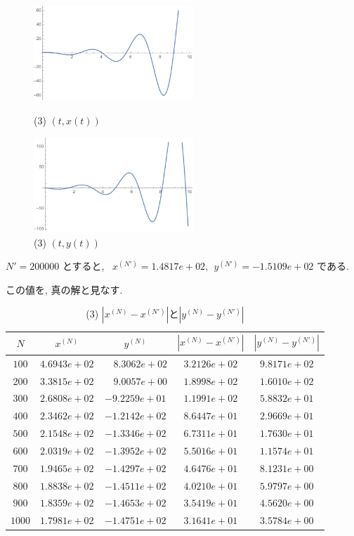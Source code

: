 \documentclass[11pt]{jsarticle}
\begin{document}
\begin{figure}[htbp]
\centering
\begin{minipage}{0.45\columnwidth}
\centering
\includegraphics[width=6cm]{images/3_x.pdf}
\caption{(3) $(t, x(t))$}
\end{minipage}
%
\begin{minipage}{0.45\columnwidth}
\centering
\includegraphics[width=6cm]{images/3_y.pdf}
\caption{(3) $(t, y(t))$}
\end{minipage}
\end{figure}

$N' = 200000$ とすると, \ $x^{(N')} = 1.4817e+02, \ \ y^{(N')} = -1.5109e+02$ である. \par
この値を, 真の解と見なす. 
\begin{table}[htbp]
\centering
\begin{tabular}{|c||c|c|c|c|} \hline
\textbf{$N$} & \textbf{$x^{(N)}$} & \textbf{$y^{(N)}$} & \textbf{$|x^{(N)}-x^{(N')}|$} & \textbf{$|y^{(N)}-y^{(N')}|$} \\ \hline
$100$ & $4.6943e+02$ & \ \ $8.3062e+02$ & $3.2126e+02$ & $9.8171e+02$ \\ \hline
$200$ & $3.3815e+02$ & \ \ $9.0057e+00$ & $1.8998e+02$ & $1.6010e+02$ \\ \hline
$300$ & $2.6808e+02$ & $-9.2259e+01$ & $1.1991e+02$ & $5.8832e+01$ \\ \hline
$400$ & $2.3462e+02$ & $-1.2142e+02$ & $8.6447e+01$ & $2.9669e+01$ \\ \hline
$500$ & $2.1548e+02$ & $-1.3346e+02$ & $6.7311e+01$ & $1.7630e+01$ \\ \hline
$600$ & $2.0319e+02$ & $-1.3952e+02$ & $5.5016e+01$ & $1.1574e+01$ \\ \hline
$700$ & $1.9465e+02$ & $-1.4297e+02$ & $4.6476e+01$ & $8.1231e+00$ \\ \hline
$800$ & $1.8838e+02$ & $-1.4511e+02$ & $4.0210e+01$ & $5.9797e+00$ \\ \hline
$900$ & $1.8359e+02$ & $-1.4653e+02$ & $3.5419e+01$ & $4.5620e+00$ \\ \hline
$1000$ & $1.7981e+02$ & $-1.4751e+02$ & $3.1641e+01$ & $3.5784e+00$ \\ \hline
\end{tabular}
\caption{(3) $|x^{(N)}-x^{(N')}|$と$|y^{(N)}-y^{(N')}|$}
\end{table}
\end{document}
